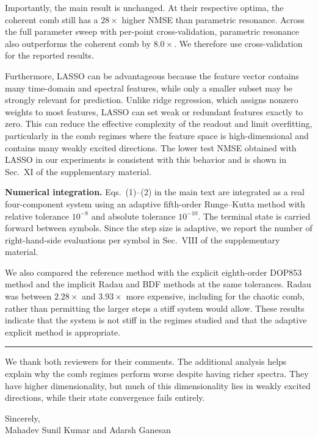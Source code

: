 \documentclass{ar2rc}
\begin{document}
Importantly, the main result is unchanged. At their respective optima, the coherent comb still has a $28\times$ higher NMSE than parametric resonance. Across the full parameter sweep with per-point cross-validation, parametric resonance also outperforms the coherent comb by $8.0\times$. We therefore use cross-validation for the reported results.

Furthermore, LASSO can be advantageous because the feature vector contains many time-domain and spectral features, while only a smaller subset may be strongly relevant for prediction. Unlike ridge regression, which assigns nonzero weights to most features, LASSO can set weak or redundant features exactly to zero. This can reduce the effective complexity of the readout and limit overfitting, particularly in the comb regimes where the feature space is high-dimensional and contains many weakly excited directions. The lower test NMSE obtained with LASSO in our experiments is consistent with this behavior and is shown in Sec.~XI of the supplementary material.

\textbf{Numerical integration.} Eqs.~(1)--(2) in the main text are integrated as a real four-component system using an adaptive fifth-order Runge--Kutta method with relative tolerance $10^{-8}$ and absolute tolerance $10^{-10}$. The terminal state is carried forward between symbols. Since the step size is adaptive, we report the number of right-hand-side evaluations per symbol in Sec.~VIII of the supplementary material.

We also compared the reference method with the explicit eighth-order DOP853 method and the implicit Radau and BDF methods at the same tolerances. Radau was between $2.28\times$ and $3.93\times$ more expensive, including for the chaotic comb, rather than permitting the larger steps a stiff system would allow. These results indicate that the system is not stiff in the regimes studied and that the adaptive explicit method is appropriate.

\noindent\rule{\textwidth}{0.4pt}

We thank both reviewers for their comments. The additional analysis helps explain why the comb regimes perform worse despite having richer spectra. They have higher dimensionality, but much of this dimensionality lies in weakly excited directions, while their state convergence fails entirely.

Sincerely,\\
Mahadev Sunil Kumar and Adarsh Ganesan
\end{document}
